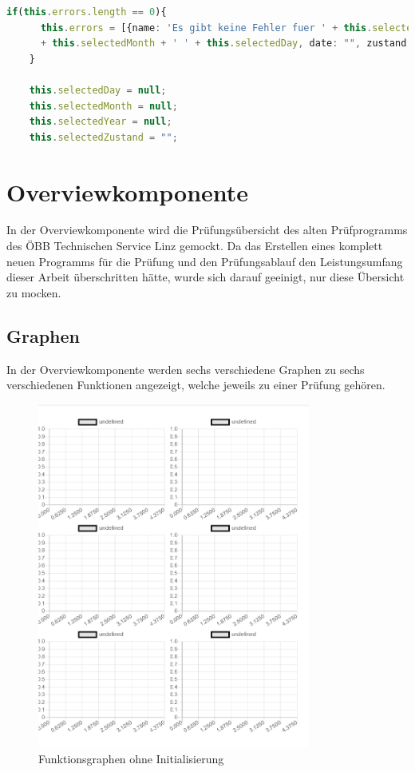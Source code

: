 \begin{lstlisting}[language=Typescript, caption={Keine Fehler und Zurücksetzen des Filter-Menüs}]
    if(this.errors.length == 0){
      this.errors = [{name: 'Es gibt keine Fehler fuer ' + this.selectedZustand + ' ' + this.selectedYear + ' '
      + this.selectedMonth + ' ' + this.selectedDay, date: "", zustand: ""}]
    }

    this.selectedDay = null;
    this.selectedMonth = null;
    this.selectedYear = null;
    this.selectedZustand = "";
\end{lstlisting}

\section{Overviewkomponente}
In der Overviewkomponente wird die Prüfungsübersicht des alten Prüfprogramms des ÖBB Technischen Service Linz gemockt. Da das Erstellen
eines komplett neuen Programms für die Prüfung und den Prüfungsablauf den Leistungsumfang dieser Arbeit überschritten hätte, wurde
sich darauf geeinigt, nur diese Übersicht zu mocken.

\newpage
\subsection{Graphen}
In der Overviewkomponente werden sechs verschiedene Graphen zu sechs verschiedenen Funktionen angezeigt, welche jeweils zu einer
Prüfung gehören. 
\begin{figure}[H]
    \centering
    \includegraphics[width=0.80\textwidth]{pics/sixgraphsnoinit.PNG}
    \caption{Funktionsgraphen ohne Initialisierung}
    \label{fig:noinit}
\end{figure} 

